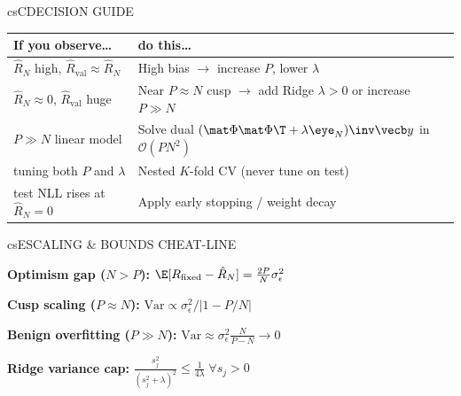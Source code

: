 \documentclass[../../../../master.tex]{subfiles}
\begin{document}
\begin{cscolumns}
\begin{cscard}{csC}{DECISION GUIDE}
  \renewcommand{\arraystretch}{1.22}\small
  \begin{tabular}{@{}>{\raggedright\arraybackslash}p{3.2cm}>{\raggedright\arraybackslash}p{4.6cm}@{}}
    \textbf{If you observe\ldots} & \textbf{do this\ldots}\\ \hline
    $\hat R_N$ high, $\hat R_{\mathrm{val}}\approx\hat R_N$ & High bias $\to$ increase $P$, lower $\lambda$\\
    $\hat R_N\approx 0$, $\hat R_{\mathrm{val}}$ huge & Near $P\approx N$ cusp $\to$ add Ridge $\lambda>0$ or increase $P\gg N$\\
    $P\gg N$ linear model & Solve dual $(\mat\Phi\mat\Phi\T+\lambda\eye_N)\inv\vecb y$ in $\mathcal O(PN^2)$\\
    tuning both $P$ and $\lambda$ & Nested $K$-fold CV (never tune on test)\\
    test NLL rises at $\hat R_N=0$ & Apply early stopping / weight decay\\
  \end{tabular}
\end{cscard}

\begin{cscard}{csE}{SCALING \& BOUNDS CHEAT-LINE}
  \begin{csbul}
    \item \textbf{Optimism gap ($N>P$):} $\E[R_{\mathrm{fixed}}-\hat R_N]=\frac{2P}{N}\sigma_\epsilon^2$
    \item \textbf{Cusp scaling ($P\approx N$):} $\mathrm{Var}\propto \sigma_\epsilon^2/|1-P/N|$
    \item \textbf{Benign overfitting ($P\gg N$):} $\mathrm{Var}\approx \sigma_\epsilon^2\frac{N}{P-N}\to 0$
    \item \textbf{Ridge variance cap:} $\frac{s_j^2}{(s_j^2+\lambda)^2}\le\frac{1}{4\lambda}\;\forall s_j>0$
  \end{csbul}
\end{cscard}


\end{cscolumns}
\end{document}
